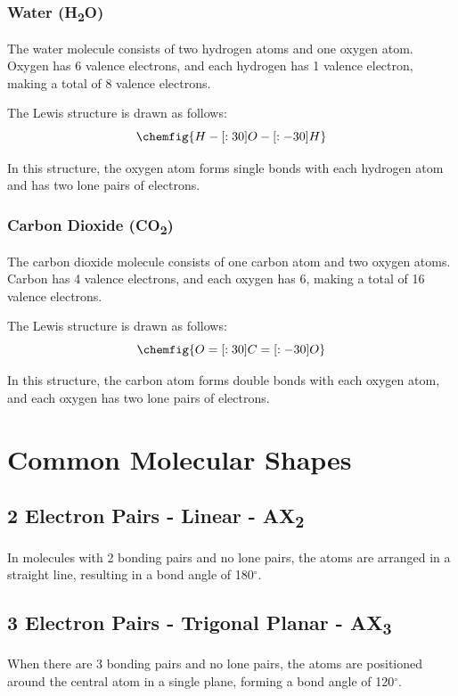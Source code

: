 \documentclass{report}
\begin{document}
\subsubsection{Water (H\textsubscript{2}O)}

The water molecule consists of two hydrogen atoms and one oxygen atom. Oxygen has 6 valence electrons, and each hydrogen has 1 valence electron, making a total of 8 valence electrons.

The Lewis structure is drawn as follows:
\[
	\chemfig{H-[:30]O-[:-30]H}
\]

In this structure, the oxygen atom forms single bonds with each hydrogen atom and has two lone pairs of electrons.

\subsubsection{Carbon Dioxide (CO\textsubscript{2})}

The carbon dioxide molecule consists of one carbon atom and two oxygen atoms. Carbon has 4 valence electrons, and each oxygen has 6, making a total of 16 valence electrons.

The Lewis structure is drawn as follows:
\[
	\chemfig{O=[:30]C=[:-30]O}
\]

In this structure, the carbon atom forms double bonds with each oxygen atom, and each oxygen has two lone pairs of electrons.

\pagebreak

\section{Common Molecular Shapes}

\subsection{2 Electron Pairs - Linear - AX\textsubscript{2}}
In molecules with 2 bonding pairs and no lone pairs, the atoms are arranged in a straight line, resulting in a bond angle of 180$^\circ$.
\begin{center}
\end{center}

\subsection{3 Electron Pairs - Trigonal Planar - AX\textsubscript{3}}
When there are 3 bonding pairs and no lone pairs, the atoms are positioned around the central atom in a single plane, forming a bond angle of 120$^\circ$.
\begin{center}
\end{center}
\end{document}

